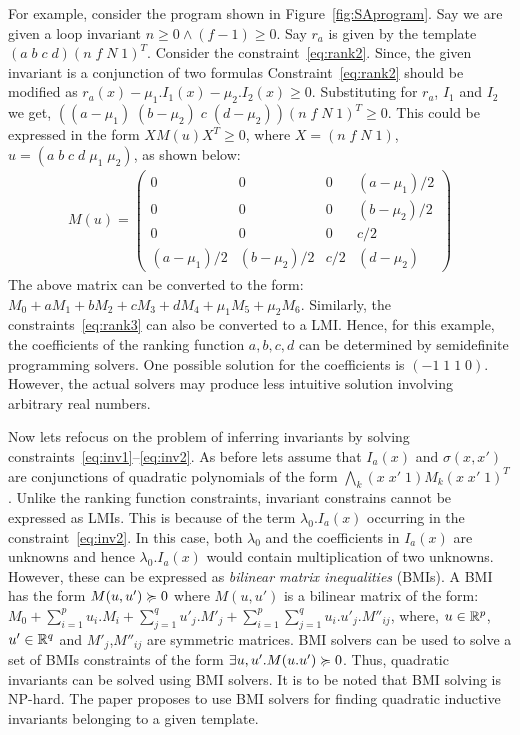 For example, consider the program shown in Figure~\ref{fig:SAprogram}.
Say we are given a loop invariant $n \ge 0 \wedge (f-1) \ge 0$.
Say $r_a$ is given by the template $(a \; b \; c \; d)(n \; f \; N \; 1)^T$. 
Consider the constraint~\ref{eq:rank2}. Since, the given invariant 
is a conjunction of two formulas Constraint~\ref{eq:rank2} should be modified as $r_a(x) - \mu_1.I_1(x)- \mu_2.I_2(x) \ge 0$. 
Substituting for $r_a$, $I_1$ and $I_2$ we get,
$((a- \mu_1) \; (b - \mu_2) \; c \; (d-\mu_2))(n \; f \; N \; 1)^T \ge 0$.
This could be expressed in the form $X M(u) X^T \ge 0$, where 
$X=(n \; f \; N \; 1)$, $u = (a \; b \; c \; d \; \mu_1 \; \mu_2)$, 
as shown below:
%
\begin{align*}
M(u) = 
\left( \begin{array}{cccc} 
0 & 0 & 0 & (a- \mu_1)/2 \\
0 & 0 & 0 & (b- \mu_2)/2 \\
0 & 0 & 0 & c/2 \\
(a- \mu_1)/2 & (b- \mu_2)/2 & c/2 & (d-\mu_2) 
\end{array} \right)
\end{align*}
%
The above matrix can be converted to the form: 
$M_0 + a M_1 + b M_2 + c M_3 + d M_4 + \mu_1 M_5 + \mu_2 M_6$.
Similarly, the constraints~\ref{eq:rank3} can also be converted to a LMI.
Hence, for this example, the coefficients of the ranking function $a,b,c,d$
can be determined by semidefinite programming solvers.
One possible solution for the coefficients is $(-1 \; 1 \; 1 \; 0)$. However,
the actual solvers may produce less intuitive solution involving arbitrary real numbers.

Now lets refocus on the problem of inferring invariants by solving constraints~\ref{eq:inv1}--\ref{eq:inv2}. As before lets assume that
$I_a(x)$ and $\sigma(x,x')$ are conjunctions of quadratic polynomials 
of the form $\bigwedge_k (x \; x' \; 1) M_k (x \; x' \; 1)^T$.
Unlike the ranking function constraints, invariant constrains cannot be 
expressed as LMIs. This is because of the term $\lambda_0.I_a(x)$ occurring
in the constraint~\ref{eq:inv2}. In this case, both $\lambda_0$ and the 
coefficients in $I_a(x)$ are unknowns and hence $\lambda_0.I_a(x)$ would contain
multiplication of two unknowns. However, these can be expressed as \emph{bilinear matrix inequalities} (BMIs). A BMI has the form $M(u,u') \succcurlyeq 0$ where $M(u,u')$
is a bilinear matrix of the form: 
$M_0 + \sum \limits_{i=1}^{p} u_i.M_i + \sum \limits_{j=1}^{q} u'_j.M'_j + \sum \limits_{i=1}^{p} \sum \limits_{j=1}^{q} u_i.u'_j.M''_{ij}$,
where, $u \in \mathbb{R}^p$, $u' \in \mathbb{R}^q$ and $M'_j$,$M''_{ij}$ are symmetric matrices. BMI solvers can be used to solve a set of BMIs constraints  of the form $\exists u,u'. M(u.u') \succcurlyeq 0$. Thus, quadratic invariants can be solved using BMI solvers. It is to be noted that BMI solving is NP-hard. The paper proposes
to use BMI solvers for finding quadratic inductive invariants belonging to a given template.


